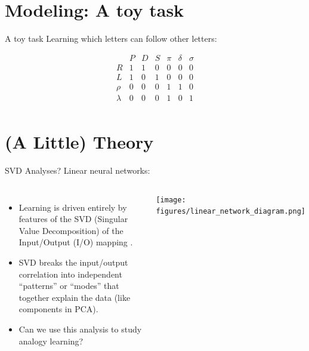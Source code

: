\documentclass{beamer}
\begin{document}
\section{Modeling: A toy task}
\begin{frame}{A toy task}
Learning which letters can follow other letters:\vspace{-2em}
\begin{center}
\[
\begin{array}{c|cccccc} 
& P & D & S & \pi & \delta & \sigma \\
\hline
R & 1 & 1 & 0 & 0 & 0 & 0 \\
L & 1 & 0 & 1 & 0 & 0 & 0 \\
\rho & 0 & 0 & 0 & 1 & 1 & 0\\
\lambda & 0 & 0 & 0 & 1 & 0 & 1\\
\end{array} 
\]
\end{center}
\end{frame}

\section{(A Little) Theory}
\begin{frame}{SVD Analyses?}
Linear neural networks:
\begin{columns}
\begin{itemize}
    \item<2-> Learning is driven entirely by features of the SVD (Singular Value Decomposition) of the Input/Output (I/O) mapping \cite{Saxe2013}.
    \item<3-> SVD breaks the input/output correlation into independent ``patterns'' or ``modes'' that together explain the data (like components in PCA).
    \item<4-> Can we use this analysis to study analogy learning?
\end{itemize}
    \texttt{[image: figures/linear\_network\_diagram.png]}
\end{columns}
\end{frame}
\end{document}
